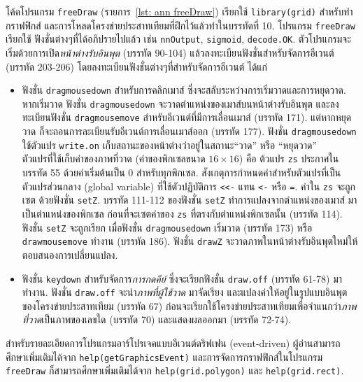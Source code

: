 โค้ดโปรแกรม \texttt{freeDraw} (รายการ~\ref{lst: ann freeDraw}) เรียกใช้ \texttt{library(grid)} สำหรับทำกราฟฟิกส์ และการโหลดโครงข่ายประสาทเทียมที่ฝึกไว้แล้วทำในบรรทัดที่ 10.
โปรแกรม \texttt{freeDraw} เรียกใช้ ฟังชั่นต่างๆที่ได้อภิปรายไปแล้ว เช่น \texttt{nnOutput}, \texttt{sigmoid}, \texttt{decode.OK}.
ตัวโปรแกรมจะเริ่มด้วยการเปิด\textit{หน้าต่างรับอินพุต} (บรรทัด 90-104)
แล้วลงทะเบียนฟังชั่นสำหรับจัดการอีเวนต์ (บรรทัด 203-206) โดยลงทะเบียนฟังชั่นต่างๆที่สำหรับจัดการอีเวนต์ ได้แก่ 
\begin{itemize}
\item ฟังชั่น \texttt{dragmousedown} สำหรับการคลิกเมาส์ ซึ่งจะสลับระหว่างการเริ่มวาดและการหยุดวาด. 
หากเริ่มวาด ฟังชั่น \texttt{dragmousedown} จะวาดตำแหน่งของเมาส์บนหน้าต่างรับอินพุต และลงทะเบียนฟังชั่น \texttt{dragmousemove} สำหรับอีเวนต์ที่มีการเลื่อนเมาส์ (บรรทัด 171).
แต่หากหยุดวาด ก็จะถอนการละเบียนรับอีเวนต์การเลื่อนเมาส์ออก (บรรทัด 177).
ฟังชั่น \texttt{dragmousedown} ใช้ตัวแปร \texttt{write.on} เก็บสถานะของหน้าต่างว่าอยู่ในสถานะ``วาด'' หรือ ``หยุดวาด''
\\
ตัวแปรที่ใช้เก็บค่าของภาพที่วาด (ค่าของพิกเซลขนาด $16 \times 16$) คือ ต้วแปร \texttt{zs} ประกาศในบรรทัด 55 ด้วยค่าเริ่มต้นเป็น $0$ สำหรับทุกพิกเซล.
สังเกตุการกำหนดค่าสำหรับตัวแปรที่เป็นตัวแปรส่วนกลาง (global variable) ที่ใช้ตัวปฏิบัติการ \texttt{<<-} แทน \texttt{<-} หรือ \texttt{=}.
ค่าใน \texttt{zs} จะถูกเซต ด้วยฟังชั่น \texttt{setZ}.
บรรทัด 111-112 ของฟังชั่น \texttt{setZ} ทำการแปลงจากตำแหน่งของเมาส์ มาเป็นตำแหน่งของพิกเซล ก่อนที่จะเซตค่าของ \texttt{zs} ที่ตรงกับตำแหน่งพิกเซลนั้น (บรรทัด 114).
ฟังชั่น \texttt{setZ} จะถูกเรียก เมื่อฟังชั่น \texttt{dragmousedown} เริ่มวาด (บรรทัด 173) หรือ \texttt{drawmousemove} ทำงาน (บรรทัด 186).
ฟังชั่น \texttt{drawZ} จะวาดภาพในหน้าต่างรับอินพุตใหม่ให้ตอบสนองการเปลี่ยนแปลง.
\item ฟังชั่น \texttt{keydown} สำหรับจัดการ\textit{การกดคีย์} ซึ่งจะเรียกฟังชั่น \texttt{draw.off} (บรรทัด 61-78) มาทำงาน. 
ฟังชั่น \texttt{draw.off} จะนำ\textit{ภาพที่ผู้ใช้วาด}%
มาจัดเรียง และแปลงค่าให้อยู่ในรูปแบบอินพุตของโครงข่ายประสาทเทียม (บรรทัด 67)
ก่อนจะเรียกใช้โครงข่ายประสาทเทียมเพื่อจำแนกว่า\textit{ภาพที่วาด}เป็นภาพของเลขใด (บรรทัด 70) 
และแสดงผลออกมา (บรรทัด 72-74).
\end{itemize}

สำหรับรายละเอียดการโปรแกรมอาร์โปรเจคแบบอีเวนต์ดริฟเฟน (event-driven) ผู้อ่านสามารถศึกษาเพิ่มเติมได้จาก \texttt{help(getGraphicsEvent)} และการจัดการกราฟฟิกส์ในโปรแกรม \texttt{freeDraw} ก็สามารถศึกษาเพิ่มเติมได้จาก \texttt{help(grid.polygon)} และ \texttt{help(grid.rect)}.


